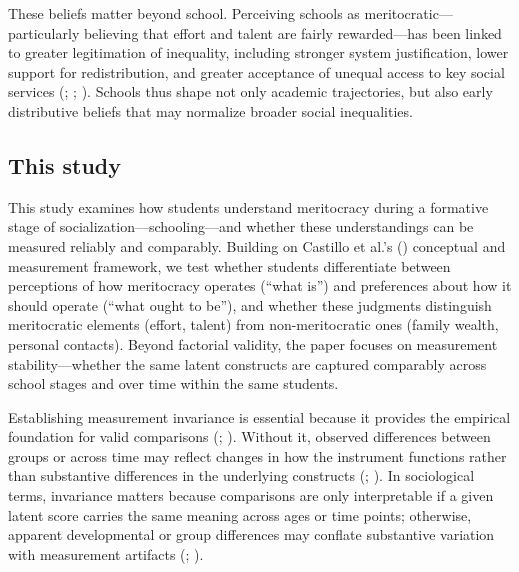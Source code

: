 \documentclass[
  13pt,
]{article}
\begin{document}
These beliefs matter beyond school. Perceiving schools as
meritocratic---particularly believing that effort and talent are fairly
rewarded---has been linked to greater legitimation of inequality,
including stronger system justification, lower support for
redistribution, and greater acceptance of unequal access to key social
services (;
;
). Schools
thus shape not only academic trajectories, but also early distributive
beliefs that may normalize broader social inequalities.

\subsection{This study}\label{this-study}

This study examines how students understand meritocracy during a
formative stage of socialization---schooling---and whether these
understandings can be measured reliably and comparably. Building on
Castillo et al.'s ()
conceptual and measurement framework, we test whether students
differentiate between perceptions of how meritocracy operates (``what
is'') and preferences about how it should operate (``what ought to
be''), and whether these judgments distinguish meritocratic elements
(effort, talent) from non-meritocratic ones (family wealth, personal
contacts). Beyond factorial validity, the paper focuses on measurement
stability---whether the same latent constructs are captured comparably
across school stages and over time within the same students.

Establishing measurement invariance is essential because it provides the
empirical foundation for valid comparisons
(;
).
Without it, observed differences between groups or across time may
reflect changes in how the instrument functions rather than substantive
differences in the underlying constructs
(;
).
In sociological terms, invariance matters because comparisons are only
interpretable if a given latent score carries the same meaning across
ages or time points; otherwise, apparent developmental or group
differences may conflate substantive variation with measurement
artifacts (;
).
\end{document}
